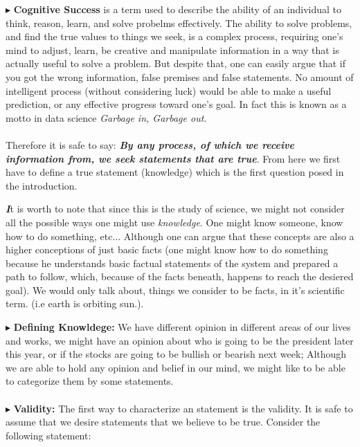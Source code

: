 \documentclass[9pt,a4paper,twocolumn]{article}
\newcounter{def}
\newenvironment{callout}
	{\begin{calloutbox}\color{charcoal}\textbf\textit}
	{\end{calloutbox}}
\newcommand{\newpoint}[1]{\indent$\blacktriangleright$ \textbf{#1}}
\begin{document}
            \newpoint{Cognitive Success} is a term used to describe the ability of an individual to think, reason, learn, and solve probelms effectively. The ability to solve problems, and find the true values to things we seek, is a complex process, requiring one's mind to adjust, learn, be creative and manipulate information in a way that is actually useful to solve a problem. But despite that, one can easily argue that if you got the wrong information, false premises and false statements. No amount of intelligent process (without considering luck) would be able to make a useful prediction, or any effective progress toward one's goal. In fact this is known as a motto in data science \textit{Garbage in, Garbage out.}\cite{sep-epistemology}\cite{Clegg2017-ev}
            \\
            \\
            Therefore it is safe to say: \textbf{\textit{By any process, of which we receive information from, we seek statements that are true}}. From here we first have to define a true statement (knowledge) which is the first question posed in the introduction.
            \begin{callout}
                It is worth to note that since this is the study of science, we might not consider all the possible ways one might use \textit{knowledge}. One might know someone, know how to do something, etc... Although one can argue that these concepts are also a higher conceptions of just basic facts (one might know how to do something because he understands basic factual statements of the system and prepared a path to follow, which, because of the facts beneath, happens to reach the desiered goal). We would only talk about, things we consider to be facts, in it's scientific term. (i.e earth is orbiting sun.).
            \end{callout}
                \newpoint{Defining Knowldege:} We have different opinion in different areas of our lives and works, we might have an opinion about who is going to be the president later this year, or if the stocks are going to be bullish or bearish next week; Although we are able to hold any opinion and belief in our mind, we might like to be able to categorize them by some statements.\cite{CW/E}\cite{sep-epistemology}
                \\
                \\
                \newpoint{Validity:} The first way to characterize an statement is the validity. It is safe to assume that we desire statements that we believe to be true. Consider the following statement:
\end{document}
